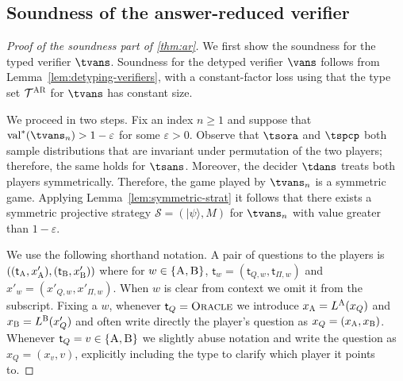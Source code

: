 \documentclass[11pt]{article}
\theoremstyle{definition}
\newcommand{\ket}[1]{|#1\rangle}
\newcommand{\val}{\ensuremath{\mathrm{val}}}
\newcommand{\eps}{\varepsilon}
\newcommand{\strategy}{\mathscr{S}}
\newcommand{\type}{\mathcal{T}}
\newcommand{\gamestyle}[1]{\ensuremath{\textsc{#1}}\xspace}
\newcommand{\ar}{\gamestyle{AR}}
\newcommand{\labelstyle}[1]{\ensuremath{\textsc{#1}}\xspace}
\newcommand{\tvarstyle}[1]{\mathsf{#1}}
\newcommand{\tvar}{\ensuremath{\tvarstyle{t}}}
\newcommand{\alice}{\labelstyle{A}}
\newcommand{\bob}{\labelstyle{B}}
\newcommand{\oracle}{\labelstyle{Oracle}}
\begin{document}
\subsection{Soundness of the answer-reduced verifier}
\label{sec:ar-soundness}



\begin{proof}[Proof of the soundness part of \cref{thm:ar}]
  We first show the soundness for the typed verifier $\tvans$.
  Soundness for the detyped verifier $\vans$ follows from
  Lemma~\ref{lem:detyping-verifiers}, with a constant-factor loss using that the
  type set $\type^\ar$ for $\tvans$ has constant size.
	
  We proceed in two steps.
  Fix an index $n\geq 1$ and suppose that $\val^*(\tvans_n) > 1-\eps$ for
  some $\eps > 0$.
  Observe that $\tsora$ and $\tspcp$ both sample distributions that
  are invariant under permutation of the two players; therefore, the same holds
  for $\tsans$.
  Moreover, the decider $\tdans$ treats both players symmetrically.
  Therefore, the game played by $\tvans_n$ is a symmetric game.
  Applying Lemma~\ref{lem:symmetric-strat} it follows that there exists a
  symmetric projective strategy $\strategy = (\ket{\psi},M)$ for
  $\tvans_n$ with value greater than $1 - \eps$.
	
  We use the following shorthand notation.
  A pair of questions to the players is
  $((\tvar_\alice,x'_\alice),(\tvar_\bob,x'_\bob))$ where for
  $w\in\{\alice,\bob\}$, $\tvar_w=(\tvar_{Q,w},\tvar_{\Pi,w})$ and
  $x'_w=(x'_{Q,w}, x'_{\Pi,w})$.
  When $w$ is clear from context we omit it from the subscript.
  Fixing a $w$, whenever $\tvar_Q = \oracle$ we introduce $x_\alice =
  L^\alice(x_Q)$ and $x_\bob =L^\bob(x'_Q)$ and often write directly the player's
  question as $x_Q = (x_\alice,x_\bob)$.
  Whenever $\tvar_Q=v \in \{\alice,\bob\}$ we slightly abuse notation and write
  the question as $x_Q = (x_{v},v)$, explicitly including the type to clarify
  which player it points to.
	

\end{proof}
\end{document}
